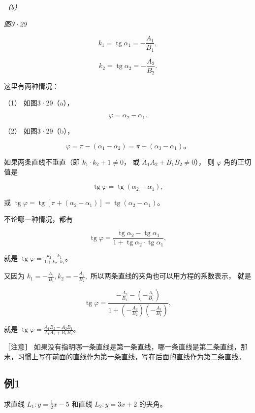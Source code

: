 \emph{（b）}

\emph{图3·29}

\[
k_{1} = \operatorname{tg} \alpha_{1} = - \frac {A_{1}}{B_{1}},
\]

\[
k_{2} = \operatorname{tg} \alpha_{2} = - \frac {A_{2}}{B_{2}}.
\]

这里有两种情况：

（1） 如图3·29（a），

\[
\varphi = \alpha_{2} - \alpha_{1}.
\]

（2） 如图3·29（b），

\[
\varphi = \pi - (\alpha_{1} - \alpha_{2}) = \pi + (\alpha_{3} - \alpha_{1})\text{。}
\]

如果两条直线不垂直（即 \(k_{1} \cdot k_{2} + 1 \neq 0\)， 或
\(A_{1}A_{2} + B_{1}B_{2} \neq 0\)）， 则 \(\varphi\) 角的正切值是

\[
\operatorname{tg} \varphi = \operatorname{tg} \left(\alpha_{2} - \alpha_{1}\right),
\]

或
\(\operatorname{tg} \varphi = \operatorname{tg} [\pi + (\alpha_2 - \alpha_1)] = \operatorname{tg} (\alpha_2 - \alpha_1)\)。

不论哪一种情况，都有

\[
\operatorname{tg} \varphi = \frac {\operatorname{tg} \alpha_{2} - \operatorname{tg} \alpha_{1}}{1 + \operatorname{tg} \alpha_{2} \cdot \operatorname{tg} \alpha_{1}},
\]

就是
\(\operatorname{tg} \varphi = \frac{k_2 - k_1}{1 + k_2 \cdot k_1}\)。

又因为 \(k_{1} = -\frac{A_{1}}{B_{1}}, k_{2} = -\frac{A_{2}}{B_{2}},\)
所以两条直线的夹角也可以用方程的系数表示， 就是

\[
\operatorname{tg} \varphi = \frac {- \frac {A_{2}}{B_{2}} - \left(- \frac {A_{1}}{B_{1}}\right)}{1 + \left(- \frac {A_{2}}{B_{2}}\right) \left(- \frac {A_{1}}{B_{1}}\right)},
\]

就是
\(\operatorname{tg} \varphi = \frac{A_1 B_2 - A_2 B_1}{A_1 A_2 + B_1 B_2}\)。

［注意］
如果没有指明哪一条直线是第一条直线，哪一条直线是第二条直线，那末，习惯上写在前面的直线作为第一条直线，写在后面的直线作为第二条直线。

\subsection{例1}\label{ux4f8b1-17}

求直线 \(L_{1}: y = \frac{1}{2} x - 5\) 和直线 \(L_{2}: y = 3x + 2\)
的夹角。

